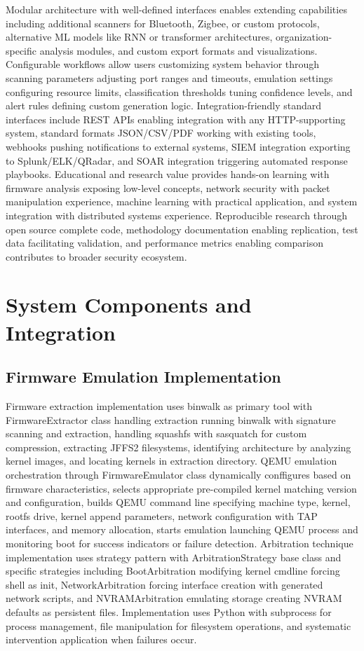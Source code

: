 Modular architecture with well-defined interfaces enables extending capabilities including additional scanners for Bluetooth, Zigbee, or custom protocols, alternative ML models like RNN or transformer architectures, organization-specific analysis modules, and custom export formats and visualizations. Configurable workflows allow users customizing system behavior through scanning parameters adjusting port ranges and timeouts, emulation settings configuring resource limits, classification thresholds tuning confidence levels, and alert rules defining custom generation logic. Integration-friendly standard interfaces include REST APIs enabling integration with any HTTP-supporting system, standard formats JSON/CSV/PDF working with existing tools, webhooks pushing notifications to external systems, SIEM integration exporting to Splunk/ELK/QRadar, and SOAR integration triggering automated response playbooks. Educational and research value provides hands-on learning with firmware analysis exposing low-level concepts, network security with packet manipulation experience, machine learning with practical application, and system integration with distributed systems experience. Reproducible research through open source complete code, methodology documentation enabling replication, test data facilitating validation, and performance metrics enabling comparison contributes to broader security ecosystem.

\section{System Components and Integration}

\subsection{Firmware Emulation Implementation}

Firmware extraction implementation uses binwalk as primary tool with FirmwareExtractor class handling extraction running binwalk with signature scanning and extraction, handling squashfs with sasquatch for custom compression, extracting JFFS2 filesystems, identifying architecture by analyzing kernel images, and locating kernels in extraction directory. QEMU emulation orchestration through FirmwareEmulator class dynamically conffigures based on firmware characteristics, selects appropriate pre-compiled kernel matching version and configuration, builds QEMU command line specifying machine type, kernel, rootfs drive, kernel append parameters, network configuration with TAP interfaces, and memory allocation, starts emulation launching QEMU process and monitoring boot for success indicators or failure detection. Arbitration technique implementation uses strategy pattern with ArbitrationStrategy base class and specific strategies including BootArbitration modifying kernel cmdline forcing shell as init, NetworkArbitration forcing interface creation with generated network scripts, and NVRAMArbitration emulating storage creating NVRAM defaults as persistent files. Implementation uses Python with subprocess for process management, file manipulation for filesystem operations, and systematic intervention application when failures occur.

